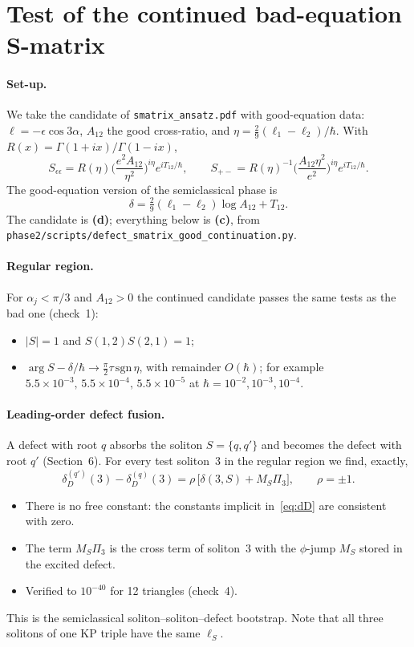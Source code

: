 \documentclass[11pt,a4paper]{article}
\newcommand{\Lc}{\textsf{\textbf{(c)}}}\newcommand{\Ld}{\textsf{\textbf{(d)}}}
\begin{document}
\section{Test of the continued bad-equation S-matrix}\label{sec:cont}

\paragraph{Set-up.} We take the candidate of \texttt{smatrix\_ansatz.pdf} with good-equation data: $\ell=-\epsilon\cos3\alpha$, $A_{12}$ the good cross-ratio, and $\eta=\tfrac29(\ell_1-\ell_2)/\hbar$. With $R(x)=\Gamma(1+ix)/\Gamma(1-ix)$,
\[
S_{\epsilon\epsilon}=R(\eta)\Big(\frac{e^2A_{12}}{\eta^2}\Big)^{i\eta}e^{iT_{12}/\hbar},\qquad
S_{+-}=R(\eta)^{-1}\Big(\frac{A_{12}\eta^2}{e^2}\Big)^{i\eta}e^{iT_{12}/\hbar}.
\]
The good-equation version of the semiclassical phase is
\[
\delta=\tfrac29(\ell_1-\ell_2)\log A_{12}+T_{12}.
\]
The candidate is \Ld; everything below is \Lc, from \texttt{phase2/scripts/defect\_smatrix\_good\_continuation.py}.

\paragraph{Regular region.} For $\alpha_j<\pi/3$ and $A_{12}>0$ the continued candidate passes the same tests as the bad one (check~1):
\begin{itemize}
\item $|S|=1$ and $S(1,2)S(2,1)=1$;
\item $\arg S-\delta/\hbar\to\tfrac\pi2\tau\,\mathrm{sgn}\,\eta$, with remainder $O(\hbar)$; for example $5.5\times10^{-3},\,5.5\times10^{-4},\,5.5\times10^{-5}$ at $\hbar=10^{-2},10^{-3},10^{-4}$.
\end{itemize}

\paragraph{Leading-order defect fusion.} A defect with root $q$ absorbs the soliton $S=\{q,q'\}$ and becomes the defect with root $q'$ (Section~6). For every test soliton~3 in the regular region we find, exactly,
\begin{equation}\label{eq:fusion}
\delta_D^{(q')}(3)-\delta_D^{(q)}(3)=\rho\,\big[\delta(3,S)+M_S\Pi_3\big],\qquad\rho=\pm1 .
\end{equation}
\begin{itemize}
\item There is no free constant: the constants implicit in~\eqref{eq:dD} are consistent with zero.
\item The term $M_S\Pi_3$ is the cross term of soliton~3 with the $\phi$-jump $M_S$ stored in the excited defect.
\item Verified to $10^{-40}$ for 12 triangles (check~4).
\end{itemize}
This is the semiclassical soliton--soliton--defect bootstrap. Note that all three solitons of one KP triple have the same $\ell_S$.
\end{document}
